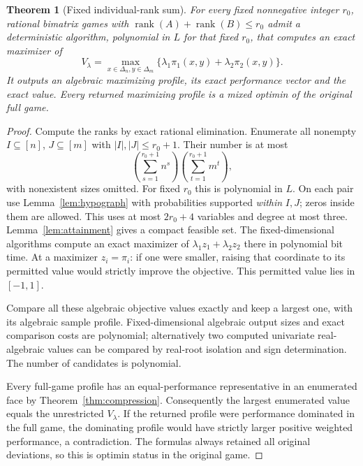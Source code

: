 \documentclass[11pt]{article}
\newtheorem{theorem}{Theorem}
\theoremstyle{remark}
\newcommand{\rank}{\operatorname{rank}}
\begin{document}
\begin{theorem}[Fixed individual-rank sum]\label{thm:algorithm}
For every fixed nonnegative integer $r_0$, rational bimatrix games with
$\rank(A)+\rank(B)\le r_0$ admit a deterministic algorithm, polynomial in $L$ for that fixed $r_0$, that computes an exact maximizer of
\[
 V_\lambda=\max_{x\in\Delta_n,y\in\Delta_m}
                  \{\lambda_1\pi_1(x,y)+\lambda_2\pi_2(x,y)\}.
\]
It outputs an algebraic maximizing profile, its exact performance vector and the exact value. Every returned maximizing profile is a mixed optimin of the original full game.
\end{theorem}
\begin{proof}
Compute the ranks by exact rational elimination. Enumerate all nonempty $I\subseteq[n]$, $J\subseteq[m]$ with $|I|,|J|\le r_0+1$. Their number is at most
\[
 \left(\sum_{s=1}^{r_0+1}n^s\right)
 \left(\sum_{t=1}^{r_0+1}m^t\right),
\]
with nonexistent sizes omitted. For fixed $r_0$ this is polynomial in $L$.
On each pair use Lemma~\ref{lem:hypograph} with probabilities supported \emph{within} $I,J$; zeros inside them are allowed. This uses at most $2r_0+4$ variables and degree at most three. Lemma~\ref{lem:attainment} gives a compact feasible set. The fixed-dimensional algorithms compute an exact maximizer of $\lambda_1z_1+\lambda_2z_2$ there in polynomial bit time. At a maximizer $z_i=\pi_i$: if one were smaller, raising that coordinate to its permitted value would strictly improve the objective. This permitted value lies in $[-1,1]$.

Compare all these algebraic objective values exactly and keep a largest one, with its algebraic sample profile. Fixed-dimensional algebraic output sizes and exact comparison costs are polynomial; alternatively two computed univariate real-algebraic values can be compared by real-root isolation and sign determination. The number of candidates is polynomial.

Every full-game profile has an equal-performance representative in an enumerated face by Theorem~\ref{thm:compression}. Consequently the largest enumerated value equals the unrestricted $V_\lambda$. If the returned profile were performance dominated in the full game, the dominating profile would have strictly larger positive weighted performance, a contradiction. The formulas always retained all original deviations, so this is optimin status in the original game.
\end{proof}
\end{document}
